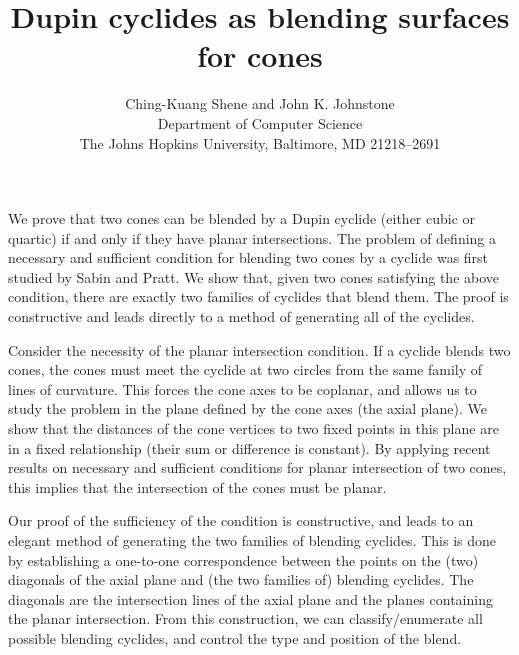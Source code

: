 
\title{Dupin cyclides as blending surfaces for cones}

\author{Ching-Kuang Shene and John K. Johnstone \\
              Department of Computer Science \\
              The Johns Hopkins University, Baltimore, MD 21218--2691}

\date{}

\setlength{\oddsidemargin}{0pt}
\setlength{\evensidemargin}{0pt}
\setlength{\headsep}{0pt}
\setlength{\topmargin}{0pt}
\setlength{\textheight}{8.75in}
\setlength{\textwidth}{6.5in}


\maketitle

We prove that two cones can be blended by a Dupin cyclide
(either cubic or quartic) if and only if they have planar intersections.
The problem of defining a necessary and sufficient condition for
blending two cones by a cyclide was first studied by Sabin and Pratt.
We show that, given two cones satisfying the above condition,
there are exactly two families of cyclides that blend them.
The proof is constructive and leads directly to a method of generating
all of the cyclides.

Consider the necessity of the planar intersection condition.
If a cyclide blends two cones, the cones must meet the cyclide at two circles
from the same family of lines of curvature.
This forces the cone axes to be coplanar,
and allows us to study the problem in the plane defined by the cone axes
(the axial plane).
We show that the distances of the cone vertices to two fixed points in this
plane are in a fixed relationship (their sum or difference is constant).
By applying recent results on necessary and sufficient conditions for planar
intersection of two cones, this implies that the intersection of the
cones must be planar.

Our proof of the sufficiency of the condition is constructive, and
leads to an elegant method of generating the two families of blending cyclides.
This is done by establishing a one-to-one correspondence between the points
on the (two) diagonals of the axial plane and (the two families of)
blending cyclides.
The diagonals are the intersection lines of the axial plane and the planes
containing the planar intersection.
From this construction, we can classify/enumerate all possible blending
cyclides, and control the type and position of the blend.

